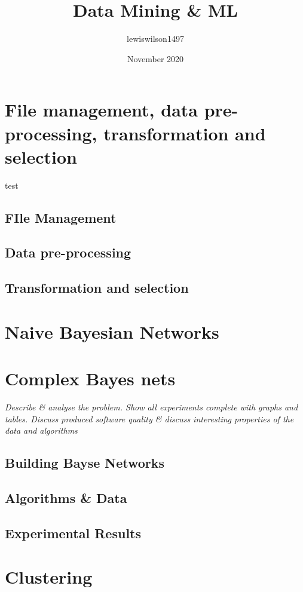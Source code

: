 \documentclass[11pt]{article}
\title{Data Mining \& ML}
\author{lewiswilson1497 }
\date{November 2020}
\begin{document}
\maketitle

\pagebreak

\tableofcontents
\thispagestyle{empty}
\pagebreak
\setcounter{page}{1}

\pagebreak


\section{File management, data pre-processing, transformation and selection}

test

\subsection{FIle Management}

\subsection{Data pre-processing}

\subsection{Transformation and selection}


\pagebreak

\section{Naive Bayesian Networks}

\pagebreak

\section{Complex Bayes nets}
\emph{Describe \& analyse the problem. Show all experiments complete with graphs and tables. Discuss produced software quality \& discuss interesting properties of the data and algorithms}

\subsection{Building Bayse Networks}


\subsection{Algorithms \& Data}

\subsection{Experimental Results}


\pagebreak

\section{Clustering}
\end{document}
